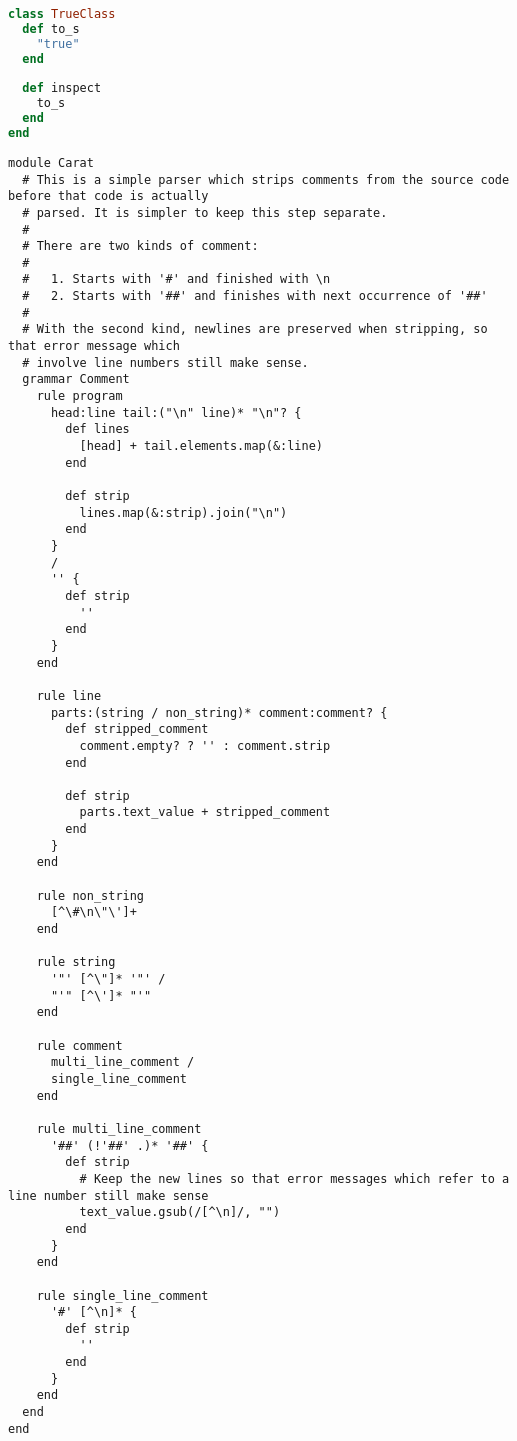 \begin{lstlisting}[title={\small\ttfamily\bfseries kernel/true\_class.carat},language=Ruby]
class TrueClass
  def to_s
    "true"
  end
  
  def inspect
    to_s
  end
end

\end{lstlisting}
\begin{lstlisting}[title={\small\ttfamily\bfseries parser/comment.treetop},language=treetop]
module Carat
  # This is a simple parser which strips comments from the source code before that code is actually
  # parsed. It is simpler to keep this step separate.
  # 
  # There are two kinds of comment:
  # 
  #   1. Starts with '#' and finished with \n
  #   2. Starts with '##' and finishes with next occurrence of '##'
  # 
  # With the second kind, newlines are preserved when stripping, so that error message which
  # involve line numbers still make sense.
  grammar Comment
    rule program
      head:line tail:("\n" line)* "\n"? {
        def lines
          [head] + tail.elements.map(&:line)
        end
        
        def strip
          lines.map(&:strip).join("\n")
        end
      }
      /
      '' {
        def strip
          ''
        end
      }
    end
    
    rule line
      parts:(string / non_string)* comment:comment? {
        def stripped_comment
          comment.empty? ? '' : comment.strip
        end
      
        def strip
          parts.text_value + stripped_comment
        end
      }
    end
    
    rule non_string
      [^\#\n\"\']+
    end
    
    rule string
      '"' [^\"]* '"' /
      "'" [^\']* "'"
    end
    
    rule comment
      multi_line_comment /
      single_line_comment
    end
    
    rule multi_line_comment
      '##' (!'##' .)* '##' {
        def strip
          # Keep the new lines so that error messages which refer to a line number still make sense
          text_value.gsub(/[^\n]/, "")
        end
      }
    end
    
    rule single_line_comment
      '#' [^\n]* {
        def strip
          ''
        end
      }
    end
  end
end

\end{lstlisting}
